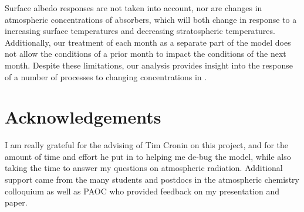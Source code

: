 \documentclass[12]{article}
\begin{document}
Surface albedo responses are not taken into account, nor are changes in atmospheric concentrations of absorbers, which will both change in response to a increasing surface temperatures and decreasing stratospheric temperatures. Additionally, our treatment of each month as a separate part of the model does not allow the conditions of a prior month to impact the conditions of the next month. Despite these limitations, our analysis provides insight into the response of a number of processes to changing concentrations in 
.

\section{Acknowledgements}
I am really grateful for the advising of Tim Cronin on this project, and for the amount of time and effort he put in to helping me de-bug the model, while also taking the time to answer my questions on atmospheric radiation. Additional support came from the many students and postdocs in the atmospheric chemistry colloquium as well as PAOC who provided feedback on my presentation and paper. 
\pagebreak


\end{document}
